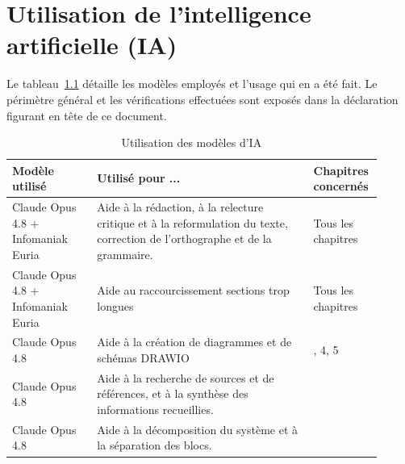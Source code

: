 \chapter{Utilisation de l'intelligence artificielle (IA)}
\label{ann:ia}

Le tableau~\ref{tab:usage_ia} détaille les modèles employés et l'usage qui en a été fait. Le périmètre général et les vérifications effectuées sont exposés dans la déclaration figurant en tête de ce document.

\begin{table}[H]
    \centering
    \renewcommand{\arraystretch}{1.4}
    \caption{Utilisation des modèles d'IA}
    \label{tab:usage_ia}
    \begin{tabular}{p{0.22\linewidth} p{0.56\linewidth} >{\centering\arraybackslash}p{0.13\linewidth}}
        \hline
        \textbf{Modèle utilisé}                     & \textbf{Utilisé pour ...}                                                                                                    & \textbf{Chapitres concernés}                                          \\
        \hline
        Claude Opus 4.8 \newline + Infomaniak Euria & Aide à la rédaction, à la relecture critique et à la reformulation du texte, correction de l'orthographe et de la grammaire. & Tous les chapitres                                                    \\
        Claude Opus 4.8 \newline + Infomaniak Euria & Aide au raccourcissement sections trop longues                                                                               & Tous les chapitres                                                    \\
        Claude Opus 4.8                             & Aide à la création de diagrammes et de schémas DRAWIO                                                                        & 3, 4, 5                                                               \\
        Claude Opus 4.8                             & Aide à la recherche de sources et de références, et à la synthèse des informations recueillies.                              & 2                                                                     \\
        Claude Opus 4.8                             & Aide à la décomposition du système et à la séparation des blocs.                                                             & 3                                                                     \\

\end{tabular}
\end{table}
